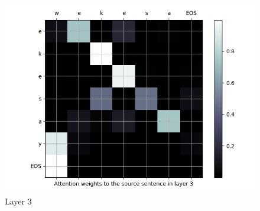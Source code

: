 \begin{enumarabic}
\begin{figure}[H]
\begin{minipage}[b]{0.33\textwidth}
        \centering
        \includegraphics[width=\textwidth]{figures/wekesa-2.png}
        \caption{Layer 3}
        \label{fig:wekesa-2}
      \end{minipage}
    \end{figure}
    
\end{enumarabic}





